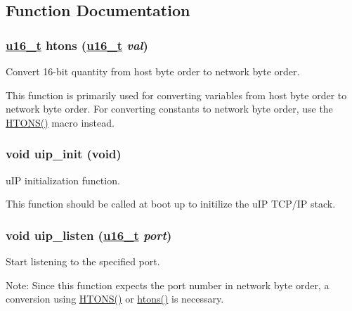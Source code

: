 \subsection{Function Documentation}
\hypertarget{a00059_ga22b04cac8cf283ca12f028578bebc06}{
\subsubsection[htons]{\setlength{\rightskip}{0pt plus 5cm}\hyperlink{a00070_gfc6499c1f28697aa3bfc2804d496fd11}{u16\_\-t} htons (\hyperlink{a00070_gfc6499c1f28697aa3bfc2804d496fd11}{u16\_\-t} {\em val})}}
\label{a00059_ga22b04cac8cf283ca12f028578bebc06}


Convert 16-bit quantity from host byte order to network byte order. 

This function is primarily used for converting variables from host byte order to network byte order. For converting constants to network byte order, use the \hyperlink{a00065_g69a7a4951ff21b302267532c21ee78fc}{HTONS()} macro instead. \hypertarget{a00059_gc48ed5f0d27721ef62a3ed02a5ad8d2e}{
\subsubsection[uip\_\-init]{\setlength{\rightskip}{0pt plus 5cm}void uip\_\-init (void)}}
\label{a00059_gc48ed5f0d27721ef62a3ed02a5ad8d2e}


u\-IP initialization function. 

This function should be called at boot up to initilize the u\-IP TCP/IP stack. \hypertarget{a00059_gdd1ab3704ecd4900eec61a6897d32dc8}{
\subsubsection[uip\_\-listen]{\setlength{\rightskip}{0pt plus 5cm}void uip\_\-listen (\hyperlink{a00070_gfc6499c1f28697aa3bfc2804d496fd11}{u16\_\-t} {\em port})}}
\label{a00059_gdd1ab3704ecd4900eec61a6897d32dc8}


Start listening to the specified port. 

\begin{Desc}
\item[Note:]Since this function expects the port number in network byte order, a conversion using \hyperlink{a00065_g69a7a4951ff21b302267532c21ee78fc}{HTONS()} or \hyperlink{a00065_ga22b04cac8cf283ca12f028578bebc06}{htons()} is necessary.\end{Desc}


